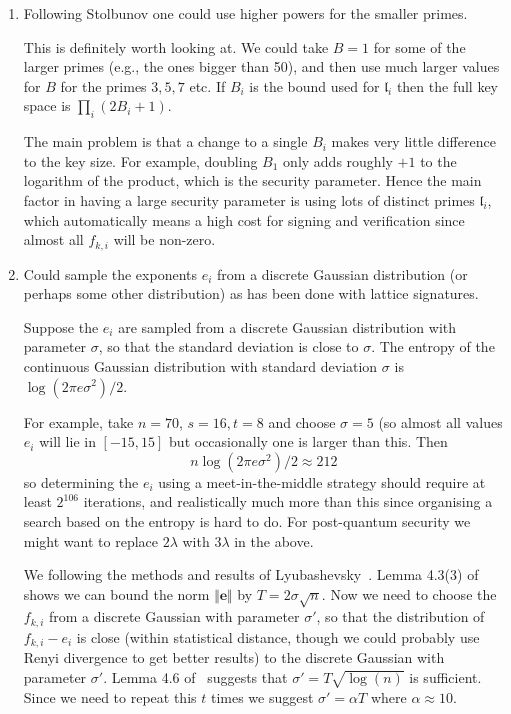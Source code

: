 \documentclass{llncs}
\renewcommand{\l}{\mathfrak{l}}
\newcommand{\e}{\mathbf{e}}
\begin{document}
\begin{enumerate}
\item Following Stolbunov one could use higher powers for the smaller primes.

This is definitely worth looking at. We could take $B=1$ for some of the larger primes (e.g., the ones bigger than 50), and then use much larger values for $B$ for the primes $3, 5, 7$ etc. If $B_i$ is the bound used for $\l_i$ then the full key space is $\prod_i (2B_i + 1)$.

The main problem is that a change to a single $B_i$ makes very little difference to the key size. For example, doubling $B_1$ only adds roughly $+1$ to the logarithm of the product, which is the security parameter.
Hence the main factor in having a large security parameter is using lots of distinct primes $\l_i$, which automatically means a high cost for signing and verification since almost all $f_{k,i}$ will be non-zero.



\item Could sample the exponents $e_i$ from a discrete Gaussian distribution (or perhaps some other distribution) as has been done with lattice signatures.

Suppose the $e_i$ are sampled from a discrete Gaussian distribution with parameter $\sigma$, so that the standard deviation is close to $\sigma$. The entropy of the continuous Gaussian distribution with standard deviation $\sigma$ is $\log( 2 \pi e \sigma^2 )/2$.

For example, take $n=70$, $s = 16, t = 8$ and choose $\sigma = 5$ (so almost all values $e_{i}$ will lie in $[-15,15]$ but occasionally one is larger than this. Then
\[
   n \log( 2 \pi e \sigma^2 )/2 \approx 212
\]
so determining the $e_i$ using a meet-in-the-middle strategy should require at least $2^{106}$ iterations, and realistically much more than this since organising a search based on the entropy is hard to do. For post-quantum security we might want to replace $2 \lambda$ with $3\lambda$ in the above.

We following the methods and results of Lyubashevsky~\cite{Lyu12}. Lemma 4.3(3) of~\cite{Lyu12} shows we can bound the norm $\Vert \e \Vert$ by $T = 2 \sigma \sqrt{n}$.
Now we need to choose the $f_{k,i}$ from a discrete Gaussian with parameter $\sigma'$, so that the distribution of $f_{k,i} - e_i$ is close (within statistical distance, though we could probably use Renyi divergence to get better results) to the discrete Gaussian with parameter $\sigma'$.
Lemma 4.6 of~\cite{Lyu12} suggests that $\sigma' = T \sqrt{\log(n)}$ is sufficient. Since we need to repeat this $t$ times we suggest $\sigma' = \alpha T $ where $\alpha \approx 10$.


\end{enumerate}
\end{document}
